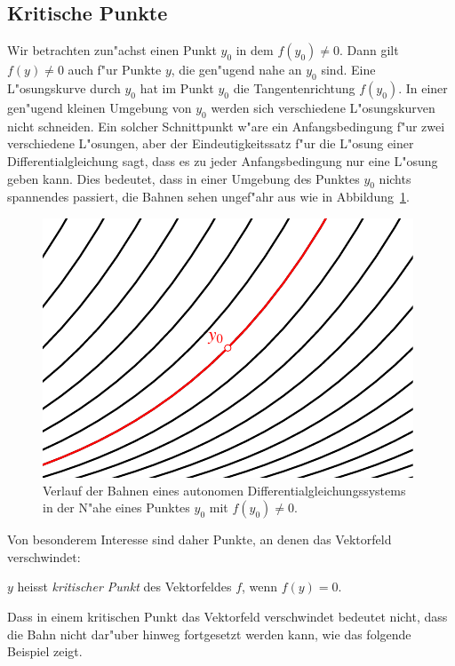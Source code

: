 %
%
\subsection{Kritische Punkte}
Wir betrachten zun"achst einen Punkt $y_0$ in dem $f(y_0)\ne 0$.
Dann gilt $f(y)\ne 0$ auch f"ur Punkte $y$, die gen"ugend nahe an 
$y_0$ sind.
Eine L"osungskurve durch $y_0$ hat im Punkt $y_0$ die Tangentenrichtung
$f(y_0)$.
In einer gen"ugend kleinen Umgebung von $y_0$ werden sich verschiedene
L"osungskurven nicht schneiden.
Ein solcher Schnittpunkt w"are ein Anfangsbedingung f"ur zwei
verschiedene L"osungen, aber der Eindeutigkeitssatz f"ur die
L"osung einer Differentialgleichung sagt, dass es zu jeder 
Anfangsbedingung nur eine L"osung geben kann.
Dies bedeutet, dass in einer Umgebung des Punktes $y_0$ nichts
spannendes passiert, die Bahnen sehen ungef"ahr aus wie in
Abbildung~\ref{geometrie:parallelebahnen}.
\begin{figure}
\centering
\includegraphics{chapters/images/geometrie-12.pdf}
\caption{Verlauf der Bahnen eines autonomen Differentialgleichungssystems
in der N"ahe eines Punktes $y_0$ mit $f(y_0)\ne 0$.
\label{geometrie:parallelebahnen}}
\end{figure}

Von besonderem Interesse sind daher Punkte, an denen das Vektorfeld
verschwindet:

\begin{definition}
$y$ heisst {\em kritischer Punkt} des Vektorfeldes $f$, wenn $f(y)=0$.
\end{definition}

Dass in einem kritischen Punkt das Vektorfeld verschwindet bedeutet nicht,
dass die Bahn nicht dar"uber hinweg fortgesetzt werden kann,
wie das folgende Beispiel zeigt.

